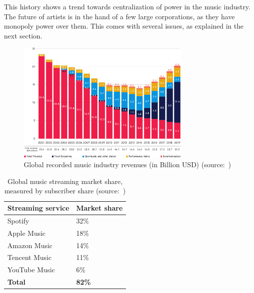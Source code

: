 This history shows a trend towards centralization of power in the music industry. The future of artists is in the hand of a few large corporations, as they have monopoly power over them. This comes with several issues, as explained in the next section.

\begin{figure}
    \centering
    \includegraphics[width=0.75\textwidth]{problem-description/music-industry-revenues-ipfi2020.png}
    \caption{Global recorded music industry revenues (in Billion USD) (source:~\cite{ifpi2020global})}
    \label{fig:music-industry-revenues}
\end{figure}

\begin{table}[]
\centering
\begin{tabular}{|l|l|}
\hline
\textbf{Streaming service} & \textbf{Market share} \\ \hline
Spotify                    & 32\%                  \\ \hline
Apple Music                & 18\%                  \\ \hline
Amazon Music               & 14\%                  \\ \hline
Tencent Music              & 11\%                  \\ \hline
YouTube Music              & 6\%                   \\ \hline
\textbf{Total}             & \textbf{82\%}         \\ \hline
\end{tabular}
\caption{Global music streaming market share, measured by subscriber share (source:~\cite{midiamarketshare2020})}
\label{tab:streaming-service-market-share}
\end{table}

